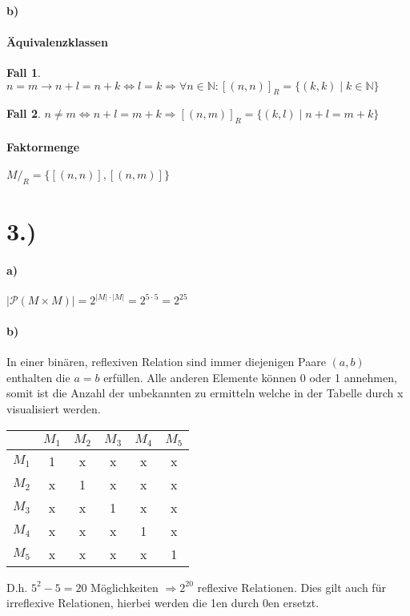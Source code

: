 \documentclass[titlepage]{article}
\theoremstyle{plain}
\newtheorem{theorem5}{Fall}
\newcommand{\N}{\mathbb{N}}
\newcommand{\1}{\mathbb{1}}
\newcommand{\0}{\mathbb{0}}
\begin{document}
		\paragraph{b)}
		\paragraph{Äquivalenzklassen}
		\begin{theorem5}
			$n=m\rightarrow n+l=n+k\Leftrightarrow l=k\Rightarrow\forall n\in \N:[(n,n)]_R=\{(k,k)\mid k\in\N\}$
		\end{theorem5}
		\begin{theorem5}
			$n\neq m\Leftrightarrow n+l=m+k\Rightarrow[(n,m)]_R=\{(k,l)\mid n+l=m+k\}$
		\end{theorem5}
		\paragraph{Faktormenge}
			$M/_R=\{[(n,n)],[(n,m)]\}$
	\section*{3.)}
		\paragraph{a)} $|\mathscr{P}(M\times M)|=2^{|M|\cdot|M|}=2^{5\cdot5}=2^{25}$
		\paragraph{b)} In einer binären, reflexiven Relation sind immer diejenigen Paare $(a,b)$ enthalten die $a=b$ erfüllen. Alle anderen Elemente können 0 oder 1 annehmen, somit ist die Anzahl der unbekannten zu ermitteln welche in der Tabelle durch x visualisiert werden.
		\begin{table}[h]
			\begin{tabular}{c|ccccc}
				&$M_1$&$M_2$&$M_3$&$M_4$&$M_5$\\\hline
				$M_1$&1&x&x&x&x\\
				$M_2$&x&1&x&x&x\\
				$M_3$&x&x&1&x&x\\
				$M_4$&x&x&x&1&x\\
				$M_5$&x&x&x&x&1
			\end{tabular}
		\end{table}
	
		D.h. $5^2-5=20$ Möglichkeiten $\Rightarrow2^20$ reflexive Relationen. Dies gilt auch für irreflexive Relationen, hierbei werden die 1en durch 0en ersetzt.
\end{document}
